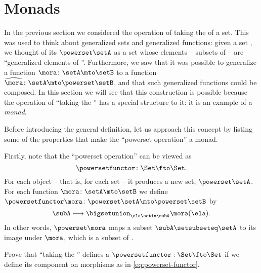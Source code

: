 
\section{Monads}
\label{sec:monads}

In the previous section we considered the operation of taking the  of a set.
This was used to think about generalized sets and generalized functions: given a set \setA, we thought of its  $\powerset \setA$ as a set whose elements -- subsets of \setA -- are ``generalized elements of \setA''.
Furthermore, we saw that it was possible to generalize a function $\mora \colon \setA \mto \setB$ to a function $\widehat \mora \colon \setA \mto \powerset \setB$, and that such generalized functions could be composed.
In this section we will see that this construction is possible because the operation of ``taking the '' has a special structure to it: it is an example of a \emph{monad}.

Before introducing the general definition, let us approach this concept by listing some of the properties that make the ``powerset operation'' a monad.

Firstly, note that the ``powerset operation'' can be viewed as 
\begin{equation}
    \powersetfunctor\colon \Set \fto \Set.
\end{equation}
For each object -- that is, for each set \setA -- it produces a new set, $\powerset \setA$.
For each function $\mora \colon \setA \mto \setB$ we define $\powersetfunctor \mora \colon \powerset \setA \mto \powerset \setB$ by
\begin{equation}
    \label{eq:powerset-functor}
    \subA \longmapsto \bigsetunion_{\ela \setin \subA} \mora(\ela).
\end{equation}
In other words, $\powerset \mora$ maps a subset $\subA \setsubseteq \setA$ to its image under $\mora$, which is a subset of \setB.

\begin{gradedexercise}
    \label{ex:PowersetImageFunctor}
    Prove that ``taking the '' defines a  $\powersetfunctor : \Set \fto \Set$ if we define its component on morphisms as in \cref{eq:powerset-functor}.
\end{gradedexercise}


